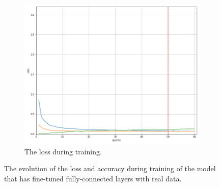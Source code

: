 \begin{figure}[!h]
\begin{subfigure}[t]{.45\textwidth}
        \includegraphics[width=\textwidth]{images/losses14fe_0.png}
        \caption{The loss during training.}
        \label{fig:lossm33}
    \end{subfigure}

    \caption{The evolution of the loss and accuracy during training of the model that has fine-tuned fully-connected layers with real data.}
    \label{fig:lossaccm33}
\end{figure}